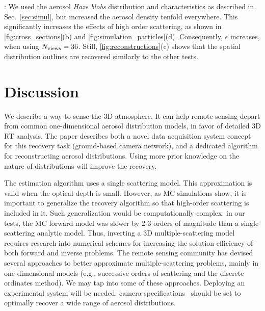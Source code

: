 \documentclass[10pt,letterpaper]{article}
\newcommand{\fix}[2]{\st{#1}\hl{#2}}
\begin{document}
: We used the aerosol {\em Haze blobs} distribution
and characteristics as described in Sec.~\ref{sec:simul}, but increased the
aerosol density tenfold everywhere. This significantly increases the effects
of high order scattering, as shown in \cref{fig:cross_sections}(b) and
\cref{fig:simulation_particles}(d). Consequently, $\epsilon$ increases,
when using $N_{\rm views}=36$. Still, \cref{fig:reconstructions}(c) shows
that the spatial distribution outlines are recovered similarly to the other
tests.


\section{Discussion}
\label{sec:conclusions}

We describe a way to sense the 3D atmosphere. It can help remote
sensing depart from common one-dimensional aerosol distribution models, in favor
of detailed 3D RT analysis.  The paper describes both a novel data
acquisition system concept for this recovery task (ground-based camera
network), and a dedicated algorithm for reconstructing aerosol
distributions. Using more prior knowledge on the nature of
distributions will improve the recovery.

The estimation algorithm
uses a single scattering model. This approximation is valid when the
optical depth is small. However, as MC simulations show, it is
important to generalize the recovery algorithm so that high-order scattering
is included in it. Such generalization would be computationally complex:
in our tests, the MC forward model was slower by 2-3 orders of magnitude
than a single-scattering analytic model. Thus, inverting a 3D multiple-scattering
model requires research into numerical schemes for increasing the solution
efficiency of both forward and inverse problems.
The remote sensing community has devised several approaches to better approximate
multiple-scattering problems, mainly in one-dimensional models (e.g., successive
orders of scattering and the discrete ordinates method). We may tap into some of these approaches.
Deploying an experimental system will be needed: camera specifications~\cite{Pust2011}
should be set to optimally recover a wide range of aerosol distributions.
\end{document}
